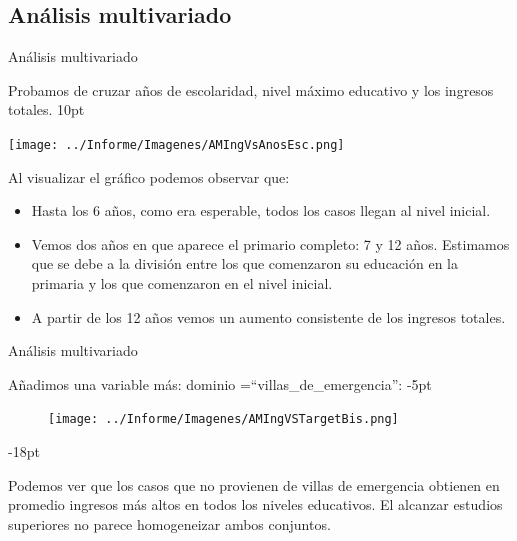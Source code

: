 \documentclass[pdf]{beamer}
\def\vspace{}%
\begin{document}
{%

    \subsection{Análisis multivariado}

\begin{frame}{Análisis multivariado}
    \footnotesize

    Probamos de cruzar años de escolaridad, nivel máximo educativo y los ingresos totales.
    \vspace{10pt}

    \begin{minipage}{0.6\textwidth}
        \texttt{[image: ../Informe/Imagenes/AMIngVsAnosEsc.png]}
    \end{minipage}
\begin{minipage}{0.39\textwidth}


    Al visualizar el gráfico podemos observar que:

    \begin{itemize}
        \footnotesize
        \justifying%
        \item Hasta los 6 años, como era esperable, todos los casos llegan al nivel inicial.
        \item Vemos dos años en que aparece el primario completo: 7 y 12 años. Estimamos que se debe a la división entre los que comenzaron su educación en la primaria y los que comenzaron en el nivel inicial.
        \item A partir de los 12 años vemos un aumento consistente de los ingresos totales.
    \end{itemize}
\end{minipage}
\end{frame} 

\begin{frame}{Análisis multivariado}

    \footnotesize

    Añadimos una variable más: dominio =``villas\_de\_emergencia'':
    \vspace{-5pt}

    \begin{figure}[H]
        \texttt{[image: ../Informe/Imagenes/AMIngVSTargetBis.png]}
    \end{figure}
    \vspace{-18pt}
    
    Podemos ver que los casos que no provienen de villas de emergencia  obtienen en promedio ingresos más altos en todos los niveles educativos. El alcanzar estudios superiores no parece homogeneizar ambos conjuntos. 


\end{frame}}
\end{document}
